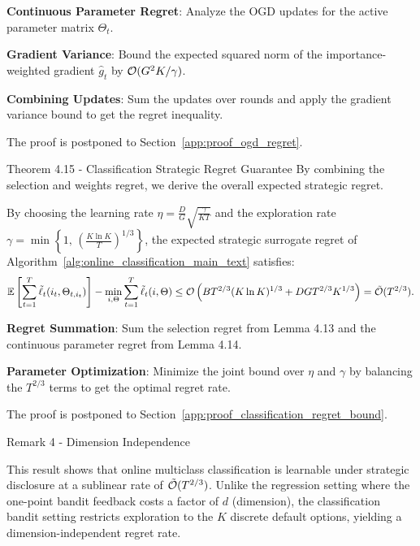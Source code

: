 \begin{guideblock}
\item \textbf{Continuous Parameter Regret}: Analyze the OGD updates for the active parameter matrix $\Theta_t$.
\item \textbf{Gradient Variance}: Bound the expected squared norm of the importance-weighted gradient $\hat{g}_t$ by $\mathcal{O}(G^2 K / \gamma)$.
\item \textbf{Combining Updates}: Sum the updates over rounds and apply the gradient variance bound to get the regret inequality.
\end{guideblock}
The proof is postponed to Section~\ref{app:proof_ogd_regret}.

\begin{sourceblock}{Theorem 4.15 - Classification Strategic Regret Guarantee}
By combining the selection and weights regret, we derive the overall expected strategic regret.
\begin{theorem}
\label{thm:classification_regret_bound}
By choosing the learning rate $\eta = \frac{D}{G}\sqrt{\frac{\gamma}{K T}}$ and the exploration rate $\gamma = \min\left\{ 1, \, \left(\frac{K \ln K}{T}\right)^{1/3} \right\}$, the expected strategic surrogate regret of Algorithm~\ref{alg:online_classification_main_text} satisfies:
\begin{equation}
    \label{eq:classification_regret_bound}
    \mathbb{E}\left[ \sum_{t=1}^T \tilde{\ell}_t(i_t, \Theta_{t, i_t}) \right] - \min_{i, \Theta} \sum_{t=1}^T \tilde{\ell}_t(i, \Theta) \le \mathcal{O}\left( B T^{2/3} (K \ln K)^{1/3} + D G T^{2/3} K^{1/3} \right) = \tilde{\mathcal{O}}(T^{2/3}).
\end{equation}
\end{theorem}
\end{sourceblock}

\begin{guideblock}
\item \textbf{Regret Summation}: Sum the selection regret from Lemma 4.13 and the continuous parameter regret from Lemma 4.14.
\item \textbf{Parameter Optimization}: Minimize the joint bound over $\eta$ and $\gamma$ by balancing the $T^{2/3}$ terms to get the optimal regret rate.
\end{guideblock}
The proof is postponed to Section~\ref{app:proof_classification_regret_bound}.

\begin{sourceblock}{Remark 4 - Dimension Independence}
\begin{remark}
This result shows that online multiclass classification is learnable under strategic disclosure at a sublinear rate of $\tilde{\mathcal{O}}(T^{2/3})$. Unlike the regression setting where the one-point bandit feedback costs a factor of $d$ (dimension), the classification bandit setting restricts exploration to the $K$ discrete default options, yielding a dimension-independent regret rate.
\end{remark}
\end{sourceblock}

